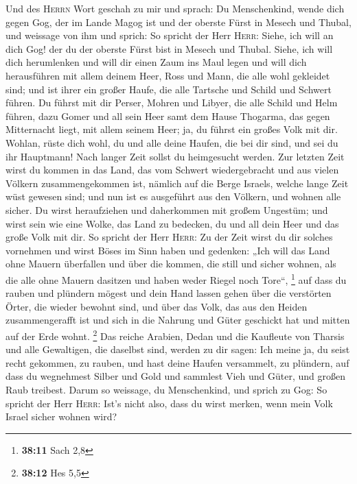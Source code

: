  Und des \textsc{Herrn} Wort geschah zu mir und sprach:
 Du Menschenkind, wende dich gegen Gog, der im Lande Magog
ist und der oberste Fürst in Mesech und Thubal, und weissage von ihm
 und sprich: So spricht der Herr \textsc{Herr}: Siehe, ich
will an dich Gog! der du der oberste Fürst bist in Mesech und Thubal.
 Siehe, ich will dich herumlenken und will dir einen Zaum
ins Maul legen und will dich herausführen mit allem deinem Heer, Ross
und Mann, die alle wohl gekleidet sind; und ist ihrer ein großer Haufe,
die alle Tartsche und Schild und Schwert führen.  Du
führst mit dir Perser, Mohren und Libyer, die alle Schild und Helm
führen,  dazu Gomer und all sein Heer samt dem Hause
Thogarma, das gegen Mitternacht liegt, mit allem seinem Heer; ja, du
führst ein großes Volk mit dir.  Wohlan, rüste dich wohl,
du und alle deine Haufen, die bei dir sind, und sei du ihr Hauptmann!
 Nach langer Zeit sollst du heimgesucht werden. Zur
letzten Zeit wirst du kommen in das Land, das vom Schwert wiedergebracht
und aus vielen Völkern zusammengekommen ist, nämlich auf die Berge
Israels, welche lange Zeit wüst gewesen sind; und nun ist es ausgeführt
aus den Völkern, und wohnen alle sicher.  Du wirst
heraufziehen und daherkommen mit großem Ungestüm; und wirst sein wie
eine Wolke, das Land zu bedecken, du und all dein Heer und das große
Volk mit dir.  So spricht der Herr \textsc{Herr}: Zu der
Zeit wirst du dir solches vornehmen und wirst Böses im Sinn haben
 und gedenken: „Ich will das Land ohne Mauern überfallen
und über die kommen, die still und sicher wohnen, als die alle ohne
Mauern dasitzen und haben weder Riegel noch Tore``, \footnote{\textbf{38:11}
  Sach 2,8}  auf dass du rauben und plündern mögest und
dein Hand lassen gehen über die verstörten Örter, die wieder bewohnt
sind, und über das Volk, das aus den Heiden zusammengerafft ist und sich
in die Nahrung und Güter geschickt hat und mitten auf der Erde wohnt.
\footnote{\textbf{38:12} Hes 5,5}  Das reiche Arabien,
Dedan und die Kaufleute von Tharsis und alle Gewaltigen, die daselbst
sind, werden zu dir sagen: Ich meine ja, du seist recht gekommen, zu
rauben, und hast deine Haufen versammelt, zu plündern, auf dass du
wegnehmest Silber und Gold und sammlest Vieh und Güter, und großen Raub
treibest.  Darum so weissage, du Menschenkind, und sprich
zu Gog: So spricht der Herr \textsc{Herr}: Ist's nicht also, dass du
wirst merken, wenn mein Volk Israel sicher wohnen wird? 
